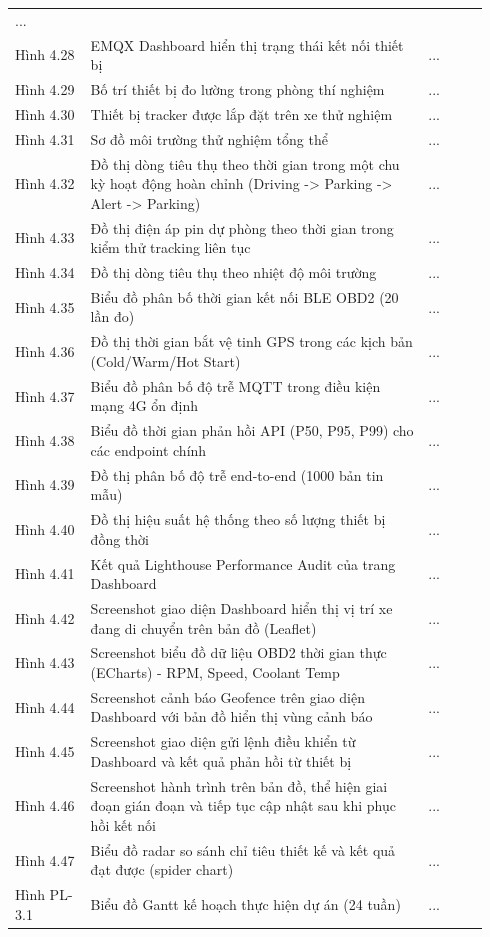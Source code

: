 \documentclass[13pt,a4paper]{extarticle}
\newcommand{\thesislongtableorignewline}{}
\let\thesislongtableorignewline\\
\renewcommand{\\}{\thesislongtableorignewline\hline}%
\let\\\thesislongtableorignewline
\begin{document}
{\begin{longtable}{|C{0.15\linewidth}|L{0.67\linewidth}|C{0.12\linewidth}|}
... \\
Hình 4.28 & EMQX Dashboard hiển thị trạng thái kết nối thiết bị & ... \\
Hình 4.29 & Bố trí thiết bị đo lường trong phòng thí nghiệm & ... \\
Hình 4.30 & Thiết bị tracker được lắp đặt trên xe thử nghiệm & ... \\
Hình 4.31 & Sơ đồ môi trường thử nghiệm tổng thể & ... \\
Hình 4.32 & Đồ thị dòng tiêu thụ theo thời gian trong một chu kỳ hoạt
động hoàn chỉnh (Driving -\textgreater{} Parking -\textgreater{} Alert
-\textgreater{} Parking) & ... \\
Hình 4.33 & Đồ thị điện áp pin dự phòng theo thời gian trong kiểm thử
tracking liên tục & ... \\
Hình 4.34 & Đồ thị dòng tiêu thụ theo nhiệt độ môi trường & ... \\
Hình 4.35 & Biểu đồ phân bố thời gian kết nối BLE OBD2 (20 lần đo) &
... \\
Hình 4.36 & Đồ thị thời gian bắt vệ tinh GPS trong các kịch bản
(Cold/Warm/Hot Start) & ... \\
Hình 4.37 & Biểu đồ phân bố độ trễ MQTT trong điều kiện mạng 4G ổn định
& ... \\
Hình 4.38 & Biểu đồ thời gian phản hồi API (P50, P95, P99) cho các
endpoint chính & ... \\
Hình 4.39 & Đồ thị phân bố độ trễ end-to-end (1000 bản tin mẫu) & ... \\
Hình 4.40 & Đồ thị hiệu suất hệ thống theo số lượng thiết bị đồng thời &
... \\
Hình 4.41 & Kết quả Lighthouse Performance Audit của trang Dashboard &
... \\
Hình 4.42 & Screenshot giao diện Dashboard hiển thị vị trí xe đang di
chuyển trên bản đồ (Leaflet) & ... \\
Hình 4.43 & Screenshot biểu đồ dữ liệu OBD2 thời gian thực (ECharts) -
RPM, Speed, Coolant Temp & ... \\
Hình 4.44 & Screenshot cảnh báo Geofence trên giao diện Dashboard với
bản đồ hiển thị vùng cảnh báo & ... \\
Hình 4.45 & Screenshot giao diện gửi lệnh điều khiển từ Dashboard và kết
quả phản hồi từ thiết bị & ... \\
Hình 4.46 & Screenshot hành trình trên bản đồ, thể hiện giai đoạn gián
đoạn và tiếp tục cập nhật sau khi phục hồi kết nối & ... \\
Hình 4.47 & Biểu đồ radar so sánh chỉ tiêu thiết kế và kết quả đạt được
(spider chart) & ... \\
Hình PL-3.1 & Biểu đồ Gantt kế hoạch thực hiện dự án (24 tuần) & ... \\
\end{longtable}
}
\end{document}
